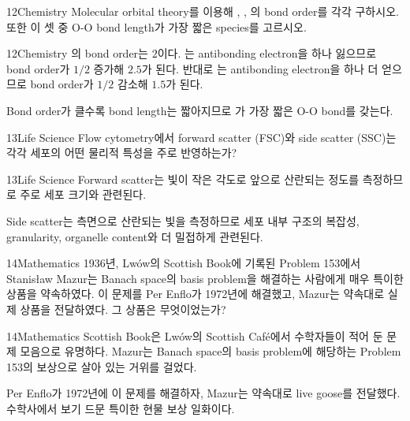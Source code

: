 \documentclass[12pt,aspectratio=169]{beamer}
\begin{document}
\begin{problemframe}{12}{Chemistry}
Molecular orbital theory를 이용해 , , 의 bond order를 각각 구하시오. 또한 이 셋 중 O-O bond length가 가장 짧은 species를 고르시오.
\end{problemframe}

\begin{solutionframe}{12}{Chemistry}
의 bond order는 $2$이다. 는 antibonding electron을 하나 잃으므로 bond order가 $1/2$ 증가해 $2.5$가 된다. 반대로 는 antibonding electron을 하나 더 얻으므로 bond order가 $1/2$ 감소해 $1.5$가 된다.

Bond order가 클수록 bond length는 짧아지므로 가 가장 짧은 O-O bond를 갖는다.
\end{solutionframe}

\begin{problemframe}{13}{Life Science}
Flow cytometry에서 forward scatter (FSC)와 side scatter (SSC)는 각각 세포의 어떤 물리적 특성을 주로 반영하는가?
\end{problemframe}

\begin{solutionframe}{13}{Life Science}
Forward scatter는 빛이 작은 각도로 앞으로 산란되는 정도를 측정하므로 주로 세포 크기와 관련된다.

Side scatter는 측면으로 산란되는 빛을 측정하므로 세포 내부 구조의 복잡성, granularity, organelle content와 더 밀접하게 관련된다.
\end{solutionframe}

\begin{problemframe}{14}{Mathematics}
1936년, Lwów의 Scottish Book에 기록된 Problem 153에서 Stanisław Mazur는 Banach space의 basis problem을 해결하는 사람에게 매우 특이한 상품을 약속하였다. 이 문제를 Per Enflo가 1972년에 해결했고, Mazur는 약속대로 실제 상품을 전달하였다. 그 상품은 무엇이었는가?
\end{problemframe}

\begin{solutionframe}{14}{Mathematics}
Scottish Book은 Lwów의 Scottish Café에서 수학자들이 적어 둔 문제 모음으로 유명하다. Mazur는 Banach space의 basis problem에 해당하는 Problem 153의 보상으로 살아 있는 거위를 걸었다.

Per Enflo가 1972년에 이 문제를 해결하자, Mazur는 약속대로 live goose를 전달했다. 수학사에서 보기 드문 특이한 현물 보상 일화이다.
\end{solutionframe}
\end{document}
